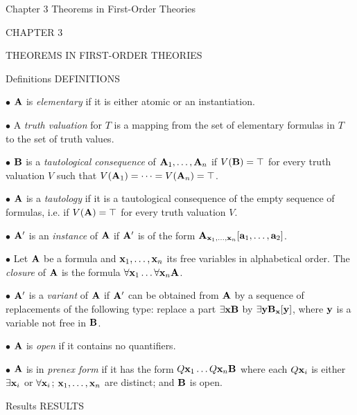  {Chapter 3 Theorems in First-Order Theories}
\centerline{\xmplbxi CHAPTER 3}
\medskip
\centerline{\xmplbx THEOREMS IN FIRST-ORDER THEORIES}
\bigskip

 {Definitions}
\beginsection DEFINITIONS

\item{$\bullet$} ${\bf A}$ is {\it elementary} if it is either atomic or an instantiation.

\item{$\bullet$} A {\it truth valuation} for $T$ is a mapping from the set of elementary 
formulas in $T$ to the set of truth values.

\item{$\bullet$} ${\bf B}$ is a {\it tautological consequence} of ${\bf A}_1, \dots , {\bf A}_n$ 
if $V({\bf B}) = \top$ for every truth valuation $V$ such that 
$V({\bf A}_1) = \cdots = V({\bf A}_n) = \top$.

\item{$\bullet$} ${\bf A}$ is a {\it tautology} if it is a tautological consequence of 
the empty sequence of formulas, i.e. if $V({\bf A}) = \top$ for every truth valuation $V$.

\item{$\bullet$} ${\bf A}'$ is an {\it instance} of ${\bf A}$ if ${\bf A}'$ is of the form ${\bf A}_{{\bf x}_1, \dots, {\bf x}_n}[{\bf a}_1, \dots, {\bf a}_2]$.

\item{$\bullet$} Let ${\bf A}$ be a formula and ${\bf x}_1, \dots, {\bf x}_n$ its free variables in alphabetical order. The {\it closure}
of ${\bf A}$ is the formula $\forall {\bf x}_1 \dots \forall {\bf x}_n {\bf A}$.

\item{$\bullet$} ${\bf A}'$ is a {\it variant} of ${\bf A}$ if ${\bf A}'$ can be obtained from ${\bf A}$ by a sequence of replacements of the
following type: replace a part $\exists {\bf x}{\bf B}$ by $\exists {\bf y}{\bf B}_{\bf x}[{\bf y}]$, where ${\bf y}$ is a variable not free in ${\bf B}$.

\item{$\bullet$} ${\bf A}$ is {\it open} if it contains no quantifiers.

\item{$\bullet$} ${\bf A}$ is in {\it prenex form} if it has the form $Q{\bf x}_1 \dots Q{\bf x}_n{\bf B}$ 
where each $Q{\bf x}_i$ is either $\exists{\bf x}_i$ or $\forall{\bf x}_i$; ${\bf x}_1, \dots, {\bf x}_n$ are
distinct; and ${\bf B}$ is open.

 {Results}
\beginsection RESULTS

